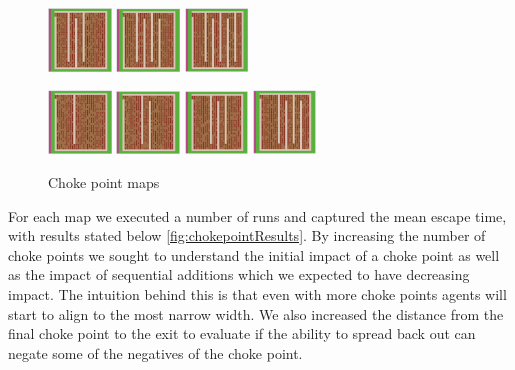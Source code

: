\documentclass[12pt,letterpaper]{article}
\begin{document}
\begin{figure}[!ht]
\begin{minipage}[b]{\linewidth}
    \includegraphics[width=0.15\textwidth]{./figures/chokepoint_2_c.png}
    \includegraphics[width=0.15\textwidth]{./figures/chokepoint_2_d.png}
    \includegraphics[width=0.15\textwidth]{./figures/chokepoint_2_e.png}
  \end{minipage}
  \begin{minipage}[b]{\linewidth}
    \includegraphics[width=0.15\textwidth]{./figures/chokepoint_3_a.png}
    \includegraphics[width=0.15\textwidth]{./figures/chokepoint_3_b.png}
    \includegraphics[width=0.15\textwidth]{./figures/chokepoint_3_c.png}
    \includegraphics[width=0.15\textwidth]{./figures/chokepoint_3_d.png}
  \end{minipage}
  \caption{Choke point maps}
\end{figure}

For each map we executed a number of runs and captured the mean escape time, with results stated below \ref{fig:chokepointResults}.  By increasing the number of choke points we sought to understand the initial impact of a choke point as well as the impact of sequential additions which we expected to have decreasing impact. The intuition behind this is that even with more choke points agents will start to align to the most narrow width.  We also increased the distance from the final choke point to the exit to evaluate if the ability to spread back out can negate some of the negatives of the choke point.  
\end{document}
